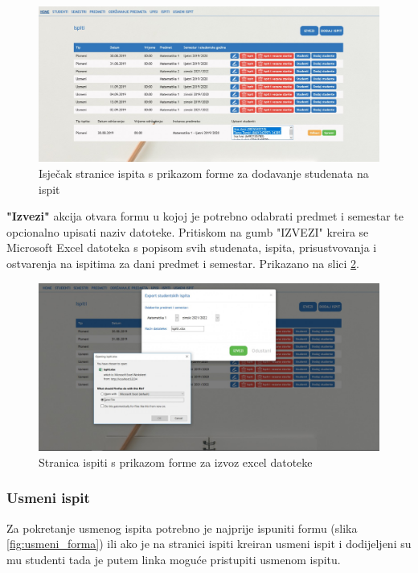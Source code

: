 \documentclass[times, utf8, diplomski]{fer}
\begin{document}
\begin{figure}[htb]
\centering
\includegraphics[width=14cm]{ispiti_addstudents.jpg}
\caption{Isječak stranice ispita s prikazom forme za dodavanje studenata na ispit}
\label{fig:ispiti_studenti_add}
\end{figure}

\hfill\break
\textbf{"Izvezi"} \hfill\break
akcija otvara formu u kojoj je potrebno odabrati predmet i semestar te opcionalno upisati naziv datoteke. Pritiskom na gumb "IZVEZI" kreira se Microsoft Excel datoteka s popisom svih studenata, ispita, prisustvovanja i ostvarenja na ispitima za dani predmet i semestar. Prikazano na slici \ref{fig:export}.


\begin{figure}[htb]
\centering
\includegraphics[width=14cm]{export.jpg}
\caption{Stranica ispiti s prikazom forme za izvoz excel datoteke}
\label{fig:export}
\end{figure}

\subsubsection{Usmeni ispit}
Za pokretanje usmenog ispita potrebno je najprije ispuniti formu (slika \ref{fig:usmeni_forma}) ili ako je na stranici ispiti kreiran usmeni ispit i dodijeljeni su mu studenti tada je putem linka moguće pristupiti usmenom ispitu.
\end{document}
